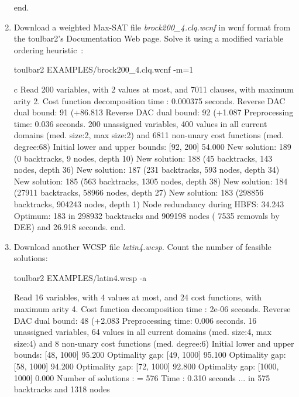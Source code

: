 \begin{enumerate}
{\begin{DoxyCode}
end.
\end{DoxyCode}}
\item Download a weighted Max-SAT file {\em brock200\_4.clq.wcnf} in wcnf format from the toulbar2's Documentation Web page. Solve it using a modified variable ordering heuristic~\cite{Schiex14a}:
\begin{DoxyCode}
	toulbar2 EXAMPLES/brock200_4.clq.wcnf -m=1
\end{DoxyCode}
{\scriptsize
\begin{DoxyCode}
c Read 200 variables, with 2 values at most, and 7011 clauses, with maximum arity 2.
Cost function decomposition time : 0.000375 seconds.
Reverse DAC dual bound: 91 (+86.813%
Reverse DAC dual bound: 92 (+1.087%
Preprocessing time: 0.036 seconds.
200 unassigned variables, 400 values in all current domains (med. size:2, max size:2) and 6811 non-unary cost functions (med. degree:68)
Initial lower and upper bounds: [92, 200] 54.000%
New solution: 189 (0 backtracks, 9 nodes, depth 10)
New solution: 188 (45 backtracks, 143 nodes, depth 36)
New solution: 187 (231 backtracks, 593 nodes, depth 34)
New solution: 185 (563 backtracks, 1305 nodes, depth 38)
New solution: 184 (27911 backtracks, 58966 nodes, depth 27)
New solution: 183 (298856 backtracks, 904243 nodes, depth 1)
Node redundancy during HBFS: 34.243 %
Optimum: 183 in 298932 backtracks and 909198 nodes ( 7535 removals by DEE) and 26.918 seconds.
end.
\end{DoxyCode}}
\item Download another WCSP file {\em latin4.wcsp}. Count the number of feasible solutions:
\begin{DoxyCode}
	toulbar2 EXAMPLES/latin4.wcsp -a
\end{DoxyCode}
{\scriptsize
\begin{DoxyCode}
Read 16 variables, with 4 values at most, and 24 cost functions, with maximum arity 4.
Cost function decomposition time : 2e-06 seconds.
Reverse DAC dual bound: 48 (+2.083%
Preprocessing time: 0.006 seconds.
16 unassigned variables, 64 values in all current domains (med. size:4, max size:4) and 8 non-unary cost functions (med. degree:6)
Initial lower and upper bounds: [48, 1000] 95.200%
Optimality gap: [49, 1000] 95.100 %
Optimality gap: [58, 1000] 94.200 %
Optimality gap: [72, 1000] 92.800 %
Optimality gap: [1000, 1000] 0.000 %
Number of solutions    : =  576
Time                   :    0.310 seconds
... in 575 backtracks and 1318 nodes

\end{DoxyCode}}
\end{enumerate}
